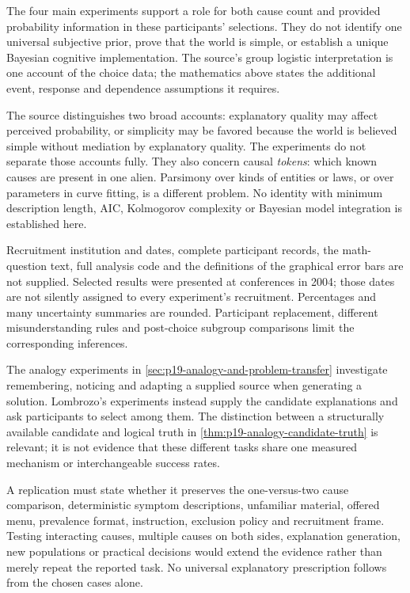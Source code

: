 The four main experiments support a role for both cause count and
provided probability information in these participants' selections.
They do not identify one universal subjective prior, prove that
the world is simple, or establish a unique Bayesian cognitive
implementation. The source's group logistic interpretation is one
account of the choice data; the mathematics above states the
additional event, response and dependence assumptions it requires.

The source distinguishes two broad accounts: explanatory quality
may affect perceived probability, or simplicity may be favored
because the world is believed simple without mediation by
explanatory quality. The experiments do not separate those accounts
fully. They also concern causal \emph{tokens}: which known causes
are present in one alien. Parsimony over kinds of entities or laws,
or over parameters in curve fitting, is a different problem.
No identity with minimum description length, AIC, Kolmogorov
complexity or Bayesian model integration is established here.

Recruitment institution and dates, complete participant records,
the math-question text, full analysis code and the definitions
of the graphical error bars are not supplied.
Selected results were presented at conferences in 2004; those
dates are not silently assigned to every experiment's recruitment.
Percentages and many uncertainty summaries are rounded.
Participant replacement, different misunderstanding rules and
post-choice subgroup comparisons limit the corresponding inferences.

The analogy experiments in
\cref{sec:p19-analogy-and-problem-transfer} investigate remembering,
noticing and adapting a supplied source when generating a solution.
Lombrozo's experiments instead supply the candidate explanations
and ask participants to select among them.
The distinction between a structurally available candidate and
logical truth in \cref{thm:p19-analogy-candidate-truth} is relevant;
it is not evidence that these different tasks share one measured
mechanism or interchangeable success rates.

A replication must state whether it preserves the one-versus-two
cause comparison, deterministic symptom descriptions, unfamiliar
material, offered menu, prevalence format, instruction, exclusion
policy and recruitment frame. Testing interacting causes, multiple
causes on both sides, explanation generation, new populations or
practical decisions would extend the evidence rather than merely
repeat the reported task. No universal explanatory prescription
follows from the chosen cases alone.
